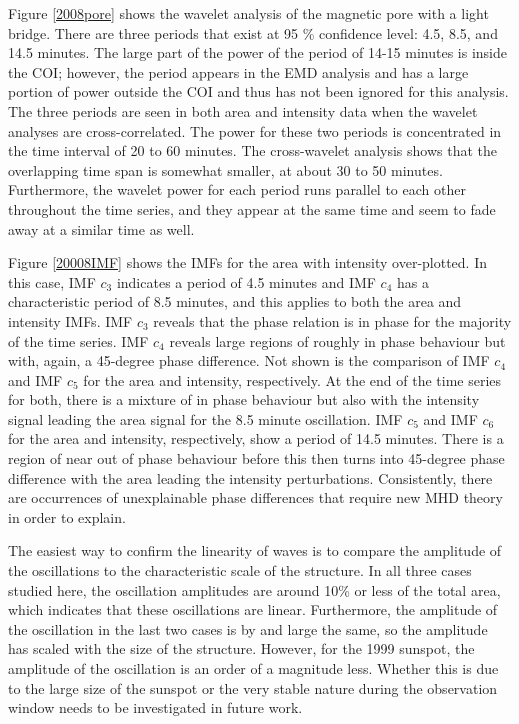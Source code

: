 	Figure \ref{2008pore} shows the wavelet analysis of the magnetic pore with a light bridge.
	There are three periods that exist at 95 \% confidence level: 4.5, 8.5, and 14.5 minutes.
	The large part of the power of the period of 14-15 minutes is inside the COI; however, the period appears in the EMD analysis and has a large portion of power outside the COI and thus has not been ignored for this analysis.
	The three periods are seen in both area and intensity data when the wavelet analyses are cross-correlated.
	The power for these two periods is concentrated in the time interval of 20 to 60 minutes.
	The cross-wavelet analysis shows that the overlapping time span is somewhat smaller, at about 30 to 50 minutes.
	Furthermore, the wavelet power for each period runs parallel to each other throughout the time series, and they appear at the same time and seem to fade away at a similar time as well.
	
	Figure \ref{20008IMF} shows the IMFs for the area with intensity over-plotted.
	In this case, IMF $c_{3}$ indicates a period of 4.5 minutes and IMF $c_{4}$ has a characteristic period of 8.5 minutes, and this applies to both the area and intensity IMFs.
	IMF $c_{3}$ reveals that the phase relation is in phase for the majority of the time series.
	IMF $c_{4}$ reveals large regions of roughly in phase behaviour but with, again, a 45-degree phase difference.
	Not shown is the comparison of IMF $c_{4}$ and IMF $c_{5}$ for the area and intensity, respectively.
	At the end of the time series for both, there is a mixture of in phase behaviour but also with the intensity signal leading the area signal for the 8.5 minute oscillation.
	IMF $c_{5}$ and IMF $c_{6}$ for the area and intensity, respectively, show a period of 14.5 minutes.
	There is a region of near out of phase behaviour before this then turns into 45-degree phase difference with the area leading the intensity perturbations.
	Consistently, there are occurrences of unexplainable phase differences that require new MHD theory in order to explain.
       
	The easiest way to confirm the linearity of waves is to compare the amplitude of the oscillations to the characteristic scale of the structure.
	In all three cases studied here, the oscillation amplitudes are around 10\% or less of the total area, which indicates that these oscillations are linear.
	Furthermore, the amplitude of the oscillation in the last two cases is by and large the same, so the amplitude has scaled with the size of the structure.
	However, for the 1999 sunspot, the amplitude of the oscillation is an order of a magnitude less. Whether this is due to the large size of the sunspot or the very stable nature during the observation window needs to be investigated in future work.
	
